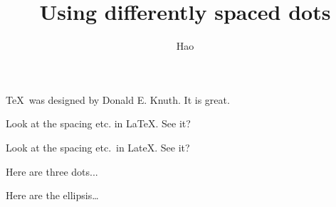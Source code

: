 \documentclass[a4paper,10pt]{article}
\title{Using differently spaced dots}
\author{Hao}
\begin{document}
\maketitle
\TeX\ was designed by Donald E. Knuth. It is great.

Look at the spacing etc. in LaTeX. See it?

Look at the spacing etc.\ in LateX\@. See it?


Here are three dots...

Here are the ellipsis\ldots
\end{document}
